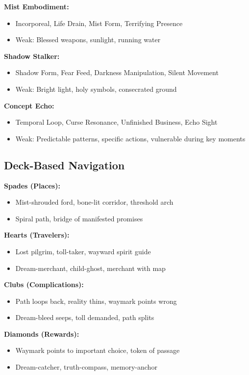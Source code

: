 \documentclass[11pt]{article}
\begin{document}
\textbf{Mist Embodiment:}
\begin{itemize}
\item Incorporeal, Life Drain, Mist Form, Terrifying Presence
\item Weak: Blessed weapons, sunlight, running water
\end{itemize}

\textbf{Shadow Stalker:}
\begin{itemize}
\item Shadow Form, Fear Feed, Darkness Manipulation, Silent Movement
\item Weak: Bright light, holy symbols, consecrated ground
\end{itemize}

\textbf{Concept Echo:}
\begin{itemize}
\item Temporal Loop, Curse Resonance, Unfinished Business, Echo Sight
\item Weak: Predictable patterns, specific actions, vulnerable during key moments
\end{itemize}

\subsection*{Deck-Based Navigation}

\textbf{Spades (Places):}
\begin{itemize}
\item Mist-shrouded ford, bone-lit corridor, threshold arch
\item Spiral path, bridge of manifested promises
\end{itemize}

\textbf{Hearts (Travelers):}
\begin{itemize}
\item Lost pilgrim, toll-taker, wayward spirit guide
\item Dream-merchant, child-ghost, merchant with map
\end{itemize}

\textbf{Clubs (Complications):}
\begin{itemize}
\item Path loops back, reality thins, waymark points wrong
\item Dream-bleed seeps, toll demanded, path splits
\end{itemize}

\textbf{Diamonds (Rewards):}
\begin{itemize}
\item Waymark points to important choice, token of passage
\item Dream-catcher, truth-compass, memory-anchor
\end{itemize}
\end{document}
